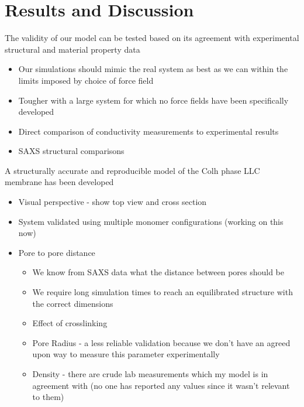 \documentclass{article}
\begin{document}
	\section{Results and Discussion}
	
	The validity of our model can be tested based on its agreement with experimental structural and material property data
	\begin{itemize}
		\item Our simulations should mimic the real system as best as we can within the limits imposed by choice of force field
		\item Tougher with a large system for which no force fields have been specifically developed
		\item Direct comparison of conductivity measurements to experimental results
		\item SAXS structural comparisons
	\end{itemize} 
	
	A structurally accurate and reproducible model of the Colh phase LLC membrane has been developed
	\begin{itemize}
		\item Visual perspective - show top view and cross section
		\item System validated using multiple monomer configurations (working on this now)
		\item Pore to pore distance
		\begin{itemize}
			\item We know from SAXS data what the distance between pores should be
			\item We require long simulation times to reach an equilibrated structure with the correct dimensions
			\item Effect of crosslinking
		\item Pore Radius - a less reliable validation because we don't have an agreed upon way to measure this parameter experimentally
		\item Density - there are crude lab measurements which my model is in agreement with (no one has reported any values since it wasn't relevant to them)
		\end{itemize}
	\end{itemize}
	
\end{document}
